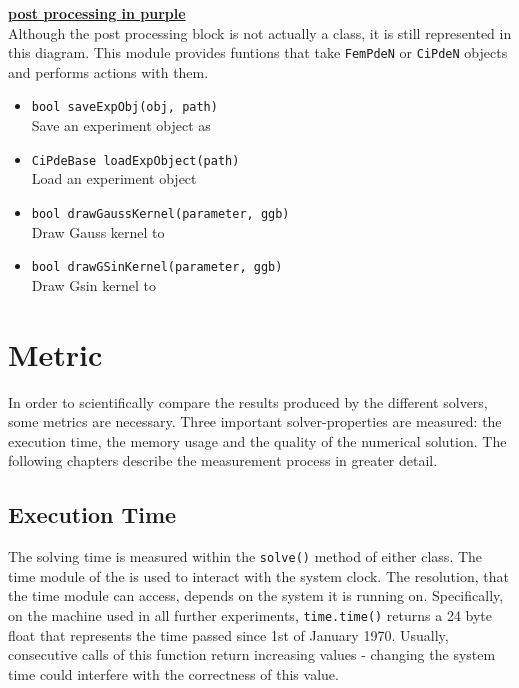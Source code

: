 \documentclass[./\jobname.tex]{subfiles}
\begin{document}
\textcolor{post_proc_colour}{\large \underline{\textbf{post processing in purple}}} \\
Although the post processing block is not actually a class, it is still represented in this diagram. This module provides funtions that take \colorbox{light-gray}{\lstinline[basicstyle=\ttfamily\color{black}]|FemPdeN|} or \colorbox{light-gray}{\lstinline[basicstyle=\ttfamily\color{black}]|CiPdeN|} objects and performs actions with them. 

\begin{itemize}
	\item \colorbox{light-gray}{\lstinline[basicstyle=\ttfamily\color{black}]|bool saveExpObj(obj, path)|} \\
	Save an experiment object as 
	\item \colorbox{light-gray}{\lstinline[basicstyle=\ttfamily\color{black}]|CiPdeBase loadExpObject(path)|} \\
	Load an experiment object
	\item \colorbox{light-gray}{\lstinline[basicstyle=\ttfamily\color{black}]|bool drawGaussKernel(parameter, ggb)|} \\
	Draw Gauss kernel to 
	\item \colorbox{light-gray}{\lstinline[basicstyle=\ttfamily\color{black}]|bool drawGSinKernel(parameter, ggb)|} \\
	Draw Gsin kernel to
\end{itemize}

\section{Metric} 
\label{chap:metric}
In order to scientifically compare the results produced by the different solvers, some metrics are necessary. Three important solver-properties are measured: the execution time, the memory usage and the quality of the numerical solution. The following chapters describe the measurement process in greater detail. 

\subsection{Execution Time}
\label{chap:metric_time}
The solving time is measured within the \colorbox{light-gray}{\lstinline[basicstyle=\ttfamily\color{black}]|solve()|} method of either class. The time module of the \cite{python_standard_library_time_2020} is used to interact with the system clock. The resolution, that the time module can access, depends on the system it is running on. Specifically, on the machine used in all further experiments, \colorbox{light-gray}{\lstinline[basicstyle=\ttfamily\color{black}]|time.time()|} returns a 24 byte float that represents the time passed since 1st of January 1970. Usually, consecutive calls of this function return increasing values - changing the system time could interfere with the correctness of this value.\\ 
\end{document}

